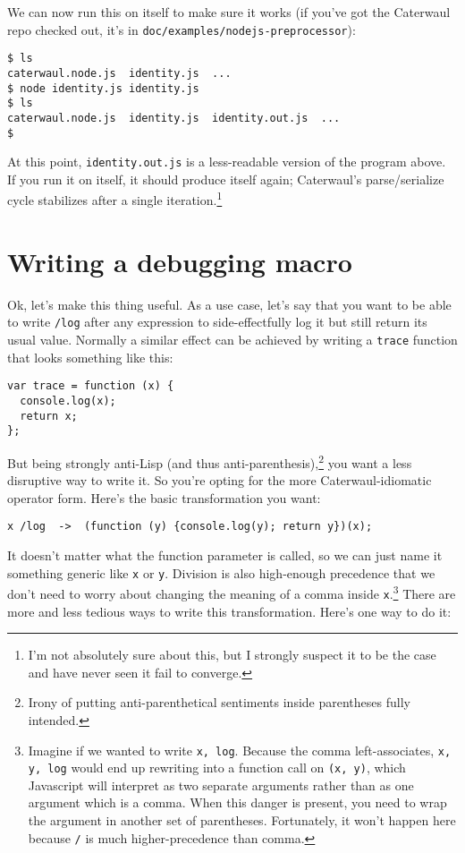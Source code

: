 \documentclass{report}
\begin{document}
  We can now run this on itself to make sure it works (if you've got the Caterwaul repo checked out, it's in {\tt doc/examples/nodejs-preprocessor}):

\begin{verbatim}
$ ls
caterwaul.node.js  identity.js  ...
$ node identity.js identity.js
$ ls
caterwaul.node.js  identity.js  identity.out.js  ...
$
\end{verbatim}

  At this point, {\tt identity.out.js} is a less-readable version of the program above. If you run it on itself, it should produce itself again; Caterwaul's parse/serialize cycle stabilizes
  after a single iteration.\footnote{I'm not absolutely sure about this, but I strongly suspect it to be the case and have never seen it fail to converge.} 

\section{Writing a debugging macro}
    Ok, let's make this thing useful. As a use case, let's say that you want to be able to write {\tt /log} after any expression to side-effectfully log it but still return its usual value.
    Normally a similar effect can be achieved by writing a {\tt trace} function that looks something like this:

\begin{verbatim}
var trace = function (x) {
  console.log(x);
  return x;
};
\end{verbatim}

    But being strongly anti-Lisp (and thus anti-parenthesis),\footnote{Irony of putting anti-parenthetical sentiments inside parentheses fully intended.} you want a less disruptive way to
    write it. So you're opting for the more Caterwaul-idiomatic operator form. Here's the basic transformation you want:

\begin{verbatim}
x /log  ->  (function (y) {console.log(y); return y})(x);
\end{verbatim}

    It doesn't matter what the function parameter is called, so we can just name it something generic like {\tt x} or {\tt y}. Division is also high-enough precedence that we don't need to
    worry about changing the meaning of a comma inside {\tt x}.\footnote{Imagine if we wanted to write {\tt x, log}. Because the comma left-associates, {\tt x, y, log} would end up rewriting
    into a function call on {\tt (x, y)}, which Javascript will interpret as two separate arguments rather than as one argument which is a comma. When this danger is present, you need to wrap
    the argument in another set of parentheses. Fortunately, it won't happen here because {\tt /} is much higher-precedence than comma.} There are more and less tedious ways to write this
    transformation. Here's one way to do it:
\end{document}
